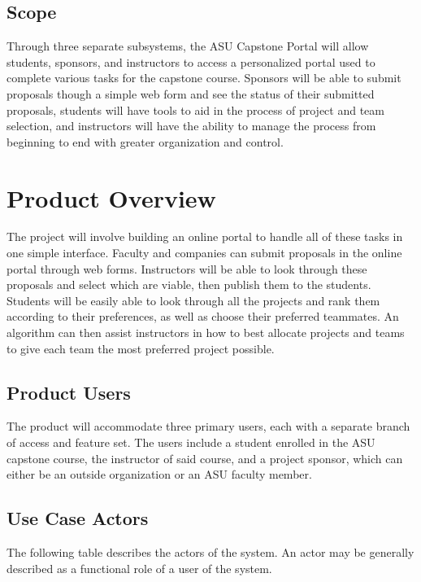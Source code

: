 \documentclass[12pt]{article}
\begin{document}
\subsection{Scope}

Through three separate subsystems, the ASU Capstone Portal will allow students, sponsors, and instructors to access a personalized portal used to complete various tasks for the capstone course. Sponsors will be able to submit proposals though a simple web form and see the status of their submitted proposals, students will have tools to aid in the process of project and team selection, and instructors will have the ability to manage the process from beginning to end with greater organization and control.

\section{Product Overview}

The project will involve building an online portal to handle all of these tasks in one simple interface. Faculty and companies can submit proposals in the online portal through web forms. Instructors will be able to look through these proposals and select which are viable, then publish them to the students. Students will be easily able to look through all the projects and rank them according to their preferences, as well as choose their preferred teammates. An algorithm can then assist instructors in how to best allocate projects and teams to give each team the most preferred project possible.

\subsection{Product Users}

The product will accommodate three primary users, each with a separate branch of access and feature set. The users include a student enrolled in the ASU capstone course, the instructor of said course, and a project sponsor, which can either be an outside organization or an ASU faculty member.

\subsection{Use Case Actors}

The following table describes the actors of the system. An actor may be generally described as a functional role of a user of the system.
\end{document}
